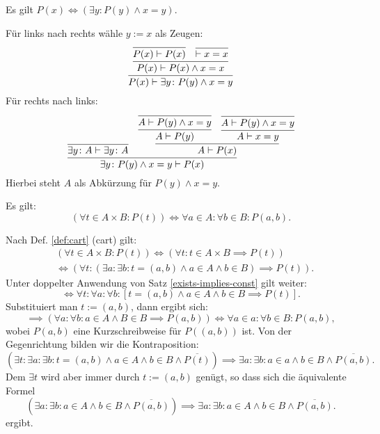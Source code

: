 \begin{Satz}\label{eq-substitution}
Es gilt $P(x)\iff (\exists y\colon P(y)\land x=y)$.
\end{Satz}
\begin{Beweis}
Für links nach rechts wähle $y:=x$ als Zeugen:
\[
\infer{P(x)\vdash\exists y\colon P(y)\land x=y}{
  \infer{P(x)\vdash P(x)\land x=x}{
    \infer{P(x)\vdash P(x)}{}
  & \infer{\vdash x=x}{}}}
\]
Für rechts nach links:
\[
\infer{\exists y\colon P(y)\land x=y\vdash P(x)}{
  \infer{\exists y\colon A\vdash\exists y\colon A}{}
& \infer{A\vdash P(x)}{
    \infer{A\vdash P(y)}{
      \infer{A\vdash P(y)\land x=y}{}}
  & \infer{A\vdash x=y}{
      \infer{A\vdash P(y)\land x=y}{}}}}
\]
Hierbei steht $A$ als Abkürzung für $P(y)\land x=y$.\,\qedsymbol
\end{Beweis}

\begin{Satz}\label{all-cart}
Es gilt:
\[(\forall t \in A{\times}B\colon P(t)) \iff \forall a{\in}A\colon\forall b{\in}B\colon P(a,b).\]
\end{Satz}

\begin{Beweis}
Nach Def. \ref{def:cart} (cart) gilt:
\begin{align*}
&(\forall t \in A{\times}B\colon P(t))\iff (\forall t\colon t\in A\times B\implies P(t))\\
&\iff (\forall t\colon (\exists a\colon\exists b\colon t=(a,b)\land a\in A\land b\in B)\implies P(t)).
\end{align*}
Unter doppelter Anwendung von Satz \ref{exists-implies-const} gilt weiter:
\[\iff \forall t\colon\forall a\colon\forall b\colon [t=(a,b)\land a\in A\land b\in B\implies P(t)].\]
Substituiert man $t:=(a,b)$, dann ergibt sich:
\[\implies (\forall a\colon\forall b\colon a\in A\land B\in B\implies P(a,b))
\iff \forall a{\in}a\colon\forall b{\in}B\colon P(a,b),\]
wobei $P(a,b)$ eine Kurzschreibweise für $P((a,b))$ ist.
Von der Gegenrichtung bilden wir die Kontraposition:
\[(\exists t\colon\exists a\colon\exists b\colon t=(a,b)\land a\in A\land b\in B\land \overline{P(t)})
\implies \exists a\colon\exists b\colon a\in a\land b\in B\land \overline{P(a,b)}.\]
Dem $\exists t$ wird aber immer durch $t:=(a,b)$ genügt, so dass sich die
äquivalente Formel
\[(\exists a\colon\exists b\colon a\in A\land b\in B\land \overline{P(a,b)})
\implies \exists a\colon \exists b\colon a\in A\land b\in B\land \overline{P(a,b)}.\]
ergibt.\;\qedsymbol
\end{Beweis}

